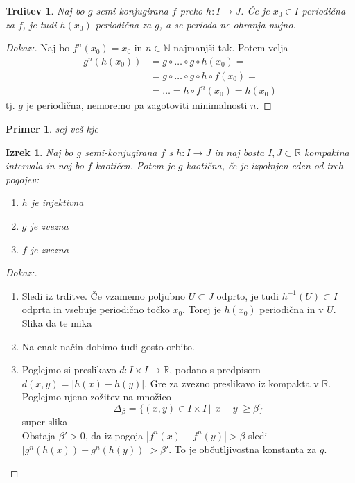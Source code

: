 \documentclass{article}
\newtheorem{trditev}{Trditev}
\newtheorem{primer}{Primer}
\newtheorem{izrek}{Izrek}
\newcommand{\N}{\mathbb{N}}
\newcommand{\R}{\mathbb{R}}
\begin{document}
\begin{trditev}
Naj bo $g$ semi-konjugirana $f$ preko $h:I \rightarrow J$. Če je $x_0 \in I$ periodična za $f$, je tudi $h(x_0)$ periodična za $g$, a se perioda ne ohranja nujno.
\end{trditev}

\begin{proof}[Dokaz:]
Naj bo $f^n(x_0) = x_0$ in $n\in \N$ najmanjši tak. Potem velja
\begin{align*}
g^n(h(x_0)) &= g\circ \dots \circ g \circ h(x_0) = \\ 
&= g\circ \dots \circ g \circ h \circ f(x_0) = \\ 
&= \dots = h \circ f^n(x_0) = h(x_0) 
\end{align*}
tj. $g$ je periodična, nemoremo pa zagotoviti minimalnosti $n$.
\end{proof}

\begin{primer}
sej veš kje
\end{primer}

\begin{izrek}
Naj bo $g$ semi-konjugirana $f$ s $h: I \rightarrow J$ in naj bosta $I, J \subset \R$ kompaktna intervala in naj bo $f$ kaotičen. Potem je $g$ kaotična, če je izpolnjen eden od treh pogojev:
\begin{enumerate}
\item[i)] $h$ je injektivna
\item[ii)] $g$ je zvezna
\item[iii)] $f$ je zvezna
\end{enumerate}
\end{izrek}

\begin{proof}[Dokaz:]
\begin{enumerate}
\item[c1)] Sledi iz trditve. Če vzamemo poljubno $U \subset J$ odprto, je tudi $h^{-1}(U) \subset I$ odprta in vsebuje periodično točko $x_0$. Torej je $h(x_0)$ periodična in v $U$. \\
Slika da te mika \\ 
\item[c2)] Na enak način dobimo tudi gosto orbito.
\item[c3)] Poglejmo si preslikavo $d: I\times I \rightarrow \R$, podano s predpisom $d(x, y) = |h(x) - h(y)|$. Gre za zvezno preslikavo iz kompakta v $\R$. Poglejmo njeno zožitev na množico
$$
\Delta_\beta = \{(x, y)\in I\times I \,|\, |x-y| \geq \beta\}
$$
super slika \\ 
Obstaja $\beta' > 0$, da iz pogoja $|f^n(x) - f^n(y)| > \beta$ sledi $|g^n(h(x)) - g^n(h(y))| > \beta'$. To je občutljivostna konstanta za $g$.
\end{enumerate}
\end{proof}
\end{document}
